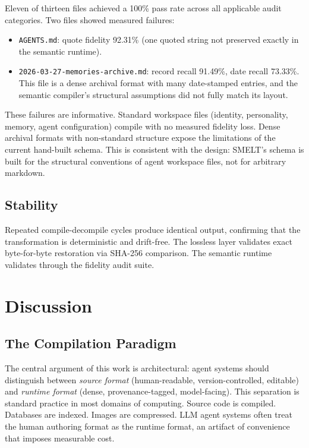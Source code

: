 \documentclass[11pt,a4paper]{article}
\begin{document}
Eleven of thirteen files achieved a 100\% pass rate across all applicable audit categories. Two files showed measured failures:

\begin{itemize}
    \item \texttt{AGENTS.md}: quote fidelity 92.31\% (one quoted string not preserved exactly in the semantic runtime).
    \item \texttt{2026-03-27-memories-archive.md}: record recall 91.49\%, date recall 73.33\%. This file is a dense archival format with many date-stamped entries, and the semantic compiler's structural assumptions did not fully match its layout.
\end{itemize}

These failures are informative. Standard workspace files (identity, personality, memory, agent configuration) compile with no measured fidelity loss. Dense archival formats with non-standard structure expose the limitations of the current hand-built schema. This is consistent with the design: SMELT's schema is built for the structural conventions of agent workspace files, not for arbitrary markdown.

\subsection{Stability}

Repeated compile-decompile cycles produce identical output, confirming that the transformation is deterministic and drift-free. The lossless layer validates exact byte-for-byte restoration via SHA-256 comparison. The semantic runtime validates through the fidelity audit suite.

\section{Discussion}

\subsection{The Compilation Paradigm}

The central argument of this work is architectural: agent systems should distinguish between \textit{source format} (human-readable, version-controlled, editable) and \textit{runtime format} (dense, provenance-tagged, model-facing). This separation is standard practice in most domains of computing. Source code is compiled. Databases are indexed. Images are compressed. LLM agent systems often treat the human authoring format as the runtime format, an artifact of convenience that imposes measurable cost.
\end{document}
